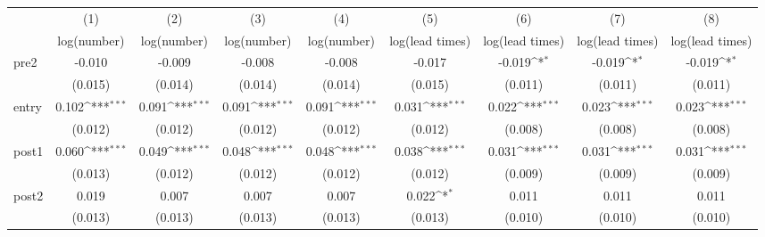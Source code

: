 {
\def\sym#1{\ifmmode^{#1}\else\(^{#1}\)\fi}
\begin{adjustbox}{max width=\textwidth}
\begin{tabular}{l*{8}{c}}
\toprule
            &\multicolumn{1}{c}{(1)}&\multicolumn{1}{c}{(2)}&\multicolumn{1}{c}{(3)}&\multicolumn{1}{c}{(4)}&\multicolumn{1}{c}{(5)}&\multicolumn{1}{c}{(6)}&\multicolumn{1}{c}{(7)}&\multicolumn{1}{c}{(8)}\\
            &\multicolumn{1}{c}{log(number)}&\multicolumn{1}{c}{log(number)}&\multicolumn{1}{c}{log(number)}&\multicolumn{1}{c}{log(number)}&\multicolumn{1}{c}{log(lead times)}&\multicolumn{1}{c}{log(lead times)}&\multicolumn{1}{c}{log(lead times)}&\multicolumn{1}{c}{log(lead times)}\\
\midrule
pre2        &      -0.010         &      -0.009         &      -0.008         &      -0.008         &      -0.017         &      -0.019\sym{*}  &      -0.019\sym{*}  &      -0.019\sym{*}  \\
            &     (0.015)         &     (0.014)         &     (0.014)         &     (0.014)         &     (0.015)         &     (0.011)         &     (0.011)         &     (0.011)         \\
\addlinespace
entry       &       0.102\sym{***}&       0.091\sym{***}&       0.091\sym{***}&       0.091\sym{***}&       0.031\sym{***}&       0.022\sym{***}&       0.023\sym{***}&       0.023\sym{***}\\
            &     (0.012)         &     (0.012)         &     (0.012)         &     (0.012)         &     (0.012)         &     (0.008)         &     (0.008)         &     (0.008)         \\
\addlinespace
post1       &       0.060\sym{***}&       0.049\sym{***}&       0.048\sym{***}&       0.048\sym{***}&       0.038\sym{***}&       0.031\sym{***}&       0.031\sym{***}&       0.031\sym{***}\\
            &     (0.013)         &     (0.012)         &     (0.012)         &     (0.012)         &     (0.012)         &     (0.009)         &     (0.009)         &     (0.009)         \\
\addlinespace
post2       &       0.019         &       0.007         &       0.007         &       0.007         &       0.022\sym{*}  &       0.011         &       0.011         &       0.011         \\
            &     (0.013)         &     (0.013)         &     (0.013)         &     (0.013)         &     (0.013)         &     (0.010)         &     (0.010)         &     (0.010)         \\

\end{tabular}
\end{adjustbox}}
